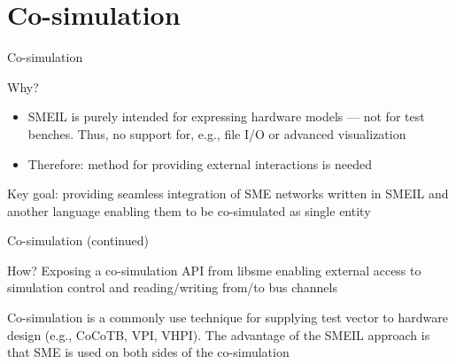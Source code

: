 \documentclass{beamer}
\begin{document}
\section{Co-simulation}

\begin{frame}{Co-simulation}

  \begin{block}{Why?}
    \begin{itemize}
    \item SMEIL is purely intended for expressing hardware models --- not for
      test benches. Thus, no support for, e.g., file I/O or advanced
      visualization
    \item Therefore: method for providing external interactions is needed
      \end{itemize}
    \end{block}
  \pause
\begin{block}{}
  Key goal: providing seamless integration of SME networks written in SMEIL and
  another language enabling them to be co-simulated as single entity
\end{block}
\end{frame}

\begin{frame}{Co-simulation  (continued)}

\begin{block}{How?}
  Exposing a co-simulation API from libsme enabling external access to
  simulation control and reading/writing from/to bus channels
\end{block}

\pause 
\begin{block}{}
  Co-simulation is a commonly use technique for supplying test vector to
  hardware design (e.g., CoCoTB, VPI, VHPI). The advantage of the SMEIL approach
  is that SME is used on both sides of the co-simulation
\end{block}
\end{frame}
\end{document}
